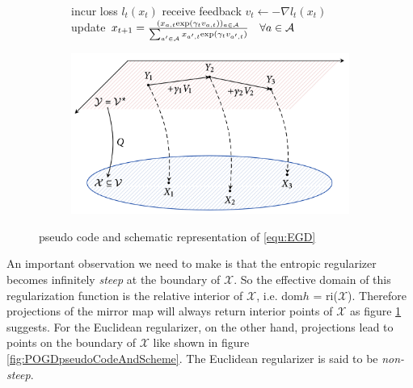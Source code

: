 \begin{figure}[H]
\centering
\begin{subfigure}{.55\textwidth}
    \begin{algorithm}[H]
    \DontPrintSemicolon
     {
    incur loss $l_t(x_t)$ \;
    receive feedback $v_t \gets -\nabla l_t(x_t)$ \;
    update $x_{t+1} = \frac{(x_{a,t}\textnormal{exp}(\gamma_t v_{a,t}))_{a\in\mathcal{A}}}{\sum_{a'\in\mathcal{A}}x_{a',t}\textnormal{exp}(\gamma_t v_{a',t})} \quad \forall a \in \mathcal{A}$ \;
    }
    \end{algorithm}
\end{subfigure}%
\begin{subfigure}{.45\textwidth}
  \centering
  \includegraphics[width=\textwidth]{logos/EGDscheme.png}
\end{subfigure}
\caption{pseudo code and schematic representation of \ref{equ:EGD}}
\label{fig:EGDpseudoCodeAndScheme}
\end{figure}

An important observation we need to make is that the entropic regularizer becomes infinitely \textit{steep} at the boundary of $\mathcal{X}$. So the effective domain of this regularization function is the relative interior of $\mathcal{X}$, i.e. dom$h$ = ri($\mathcal{X}$). Therefore projections of the mirror map will always return interior points of $\mathcal{X}$ as figure \ref{fig:EGDpseudoCodeAndScheme} suggests. For the Euclidean regularizer, on the other hand, projections lead to points on the boundary of $\mathcal{X}$ like shown in figure \ref{fig:POGDpseudoCodeAndScheme}. The Euclidean regularizer is said to be \textit{non-steep}. \\

